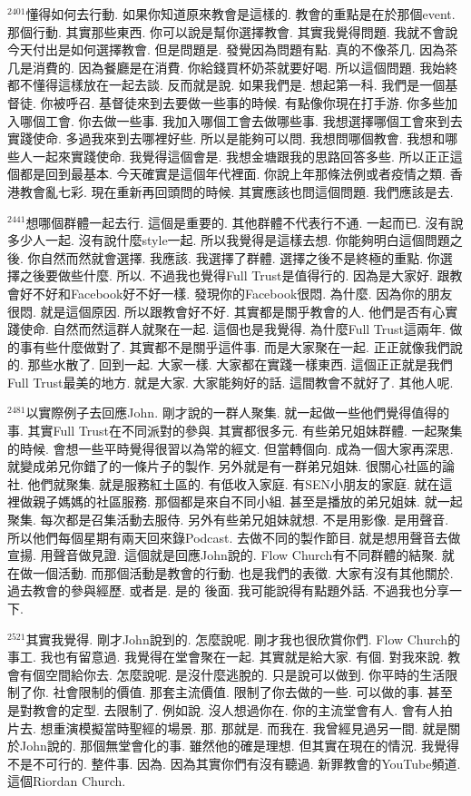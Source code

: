 \documentclass{book}
\begin{document}
$^{2401}$懂得如何去行動.
如果你知道原來教會是這樣的.
教會的重點是在於那個event.
那個行動.
其實那些東西.
你可以說是幫你選擇教會.
其實我覺得問題.
我就不會說今天付出是如何選擇教會.
但是問題是.
發覺因為問題有點.
真的不像茶几.
因為茶几是消費的.
因為餐廳是在消費.
你給錢買杯奶茶就要好喝.
所以這個問題.
我始終都不懂得這樣放在一起去談.
反而就是說.
如果我們是.
想起第一科.
我們是一個基督徒.
你被呼召.
基督徒來到去要做一些事的時候.
有點像你現在打手游.
你多些加入哪個工會.
你去做一些事.
我加入哪個工會去做哪些事.
我想選擇哪個工會來到去實踐使命.
多過我來到去哪裡好些.
所以是能夠可以問.
我想問哪個教會.
我想和哪些人一起來實踐使命.
我覺得這個會是.
我想金塘跟我的思路回答多些.
所以正正這個都是回到最基本.
今天確實是這個年代裡面.
你說上年那條法例或者疫情之類.
香港教會亂七彩.
現在重新再回頭問的時候.
其實應該也問這個問題.
我們應該是去.

$^{2441}$想哪個群體一起去行.
這個是重要的.
其他群體不代表行不通.
一起而已.
沒有說多少人一起.
沒有說什麼style一起.
所以我覺得是這樣去想.
你能夠明白這個問題之後.
你自然而然就會選擇.
我應該.
我選擇了群體.
選擇之後不是終極的重點.
你選擇之後要做些什麼.
所以.
不過我也覺得Full Trust是值得行的.
因為是大家好.
跟教會好不好和Facebook好不好一樣.
發現你的Facebook很悶.
為什麼.
因為你的朋友很悶.
就是這個原因.
所以跟教會好不好.
其實都是關乎教會的人.
他們是否有心實踐使命.
自然而然這群人就聚在一起.
這個也是我覺得.
為什麼Full Trust這兩年.
做的事有些什麼做對了.
其實都不是關乎這件事.
而是大家聚在一起.
正正就像我們說的.
那些水散了.
回到一起.
大家一樣.
大家都在實踐一樣東西.
這個正正就是我們Full Trust最美的地方.
就是大家.
大家能夠好的話.
這間教會不就好了.
其他人呢.

$^{2481}$以實際例子去回應John.
剛才說的一群人聚集.
就一起做一些他們覺得值得的事.
其實Full Trust在不同派對的參與.
其實都很多元.
有些弟兄姐妹群體.
一起聚集的時候.
會想一些平時覺得很習以為常的經文.
但當轉個向.
成為一個大家再深思.
就變成弟兄你錯了的一條片子的製作.
另外就是有一群弟兄姐妹.
很關心社區的論社.
他們就聚集.
就是服務紅土區的.
有低收入家庭.
有SEN小朋友的家庭.
就在這裡做親子媽媽的社區服務.
那個都是來自不同小組.
甚至是播放的弟兄姐妹.
就一起聚集.
每次都是召集活動去服侍.
另外有些弟兄姐妹就想.
不是用影像.
是用聲音.
所以他們每個星期有兩天回來錄Podcast.
去做不同的製作節目.
就是想用聲音去做宣揚.
用聲音做見證.
這個就是回應John說的.
Flow Church有不同群體的結聚.
就在做一個活動.
而那個活動是教會的行動.
也是我們的表徵.
大家有沒有其他關於.
過去教會的參與經歷.
或者是.
是的 後面.
我可能說得有點題外話.
不過我也分享一下.

$^{2521}$其實我覺得.
剛才John說到的.
怎麼說呢.
剛才我也很欣賞你們.
Flow Church的事工.
我也有留意過.
我覺得在堂會聚在一起.
其實就是給大家.
有個.
對我來說.
教會有個空間給你去.
怎麼說呢.
是沒什麼逃脫的.
只是說可以做到.
你平時的生活限制了你.
社會限制的價值.
那套主流價值.
限制了你去做的一些.
可以做的事.
甚至是對教會的定型.
去限制了.
例如說.
沒人想過你在.
你的主流堂會有人.
會有人拍片去.
想重演模擬當時聖經的場景.
那.
那就是.
而我在.
我曾經見過另一間.
就是關於John說的.
那個無堂會化的事.
雖然他的確是理想.
但其實在現在的情況.
我覺得不是不可行的.
整件事.
因為.
因為其實你們有沒有聽過.
新罪教會的YouTube頻道.
這個Riordan Church.
\end{document}
